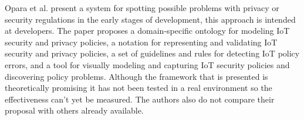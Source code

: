 Opara et al. \cite{opara2022framework} present a system for spotting possible
problems with privacy or security regulations in the early stages of development,
this approach is intended at developers. The paper proposes a domain-specific
ontology for modeling IoT security and privacy policies, a notation for
representing and validating IoT security and privacy policies, a set of
guidelines and rules for detecting IoT policy errors, and a tool for visually
modeling and capturing IoT security policies and discovering policy problems.
Although the framework that is presented is theoretically promising it has
not been tested in a real environment so the effectiveness can't yet be
measured. The authors also do not compare their proposal with others already
available.




